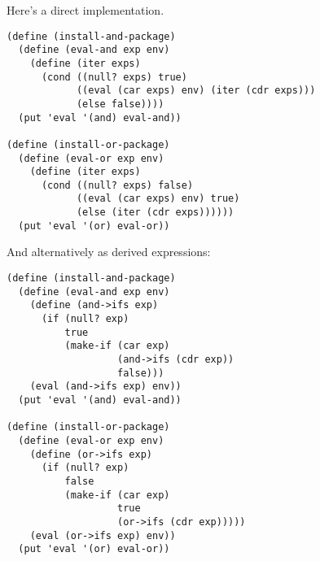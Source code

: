\documentclass[a4paper,12pt]{article}
\begin{document}
Here's a direct implementation.
\begin{lstlisting}
(define (install-and-package)
  (define (eval-and exp env)
    (define (iter exps)
      (cond ((null? exps) true)
            ((eval (car exps) env) (iter (cdr exps)))
            (else false))))
  (put 'eval '(and) eval-and))

(define (install-or-package)
  (define (eval-or exp env)
    (define (iter exps)
      (cond ((null? exps) false)
            ((eval (car exps) env) true)
            (else (iter (cdr exps))))))
  (put 'eval '(or) eval-or))
\end{lstlisting}

And alternatively as derived expressions:

\begin{lstlisting}
(define (install-and-package)
  (define (eval-and exp env)
    (define (and->ifs exp)
      (if (null? exp)
          true
          (make-if (car exp)
                   (and->ifs (cdr exp))
                   false)))
    (eval (and->ifs exp) env))
  (put 'eval '(and) eval-and))

(define (install-or-package)
  (define (eval-or exp env)
    (define (or->ifs exp)
      (if (null? exp)
          false
          (make-if (car exp)
                   true
                   (or->ifs (cdr exp)))))
    (eval (or->ifs exp) env))
  (put 'eval '(or) eval-or))
\end{lstlisting}
\end{document}
